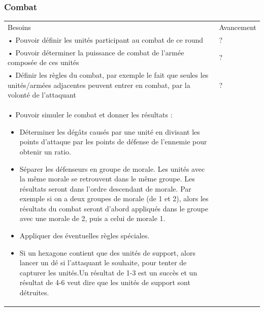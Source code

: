 \subsubsection{Combat}

\begin{center}
    \centering
    \begin{tabular}[h]{|m{14cm}|m{2cm}|}
        \hline
        \rowcolor[HTML]{FFA8A8}
        \multicolumn{2}{|c|}{\textbf{Priorité 3/3}}                                                                                                                                                   \\
        \hline
        Besoins                                                                                                                                                                          & Avancement \\
        \hline
        • Pouvoir définir les unités participant au combat de ce round                                                                                                                   & ?          \\
        • Pouvoir déterminer la puissance de combat de l'armée composée de ces unités                                                                                                    & ?          \\
        • Définir les règles du combat, par exemple le fait que seules les unités/armées adjacentes peuvent entrer en combat, par la volonté de l'attaquant                              & ?          \\
        • Pouvoir simuler le combat et donner les résultats :
        \begin{itemize}
            \item Déterminer les dégâts causés par une unité en divisant les points d'attaque par les points de défense de l'ennemie pour obtenir un ratio.
            \item Séparer les défenseurs en groupe de morale. Les unités avec la même morale se retrouvent dans le même groupe. Les résultats seront dans l'ordre descendant de morale. Par exemple si on a deux groupes de morale (de 1 et 2), alors les résultats du combat seront d'abord appliqués dans le groupe avec une morale de 2, puis a celui de morale 1.
            \item Appliquer des éventuelles règles spéciales.
            \item Si un hexagone contient que des unités de support, alors lancer un dé si l'attaquant le souhaite, pour tenter de capturer les unités.\newline Un résultat de 1-3 est un succès et un résultat de 4-6 veut dire que les unités de support sont détruites.

\end{itemize}
\end{tabular}
\end{center}
